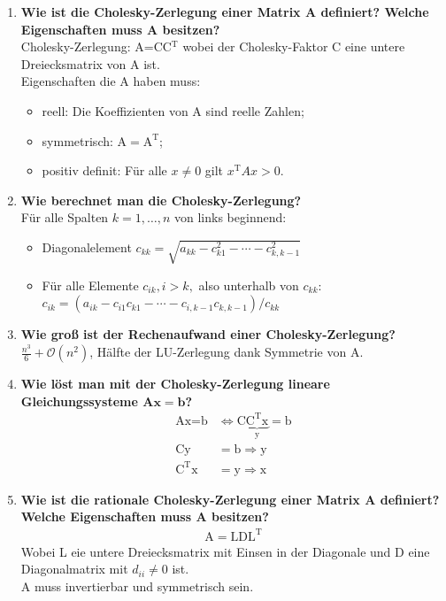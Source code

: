 \begin{enumerate}
		\pagebreak
		
		\item \textbf{Wie ist die Cholesky-Zerlegung einer Matrix A definiert? Welche Eigenschaften muss A besitzen?} \\
			Cholesky-Zerlegung: A=CC\(^\text{T}\) wobei der Cholesky-Faktor C eine untere Dreiecksmatrix von A ist. \\
			Eigenschaften die A haben muss:
			\begin{itemize}
				\item reell: Die Koeffizienten von A sind reelle Zahlen;
				\item symmetrisch: \(\text{A}=\text{A}^\text{T}\);
				\item positiv definit: Für alle \(x\neq0\) gilt \(x^\text{T}Ax>0\).
			\end{itemize}
		
		\item \textbf{Wie berechnet man die Cholesky-Zerlegung?} \\
			Für alle Spalten \(k=1,\dots,n\) von links beginnend:
			\begin{itemize}
				\item[] Diagonalelement \(c_{kk}=\sqrt{a_{kk}-c_{k1}^2-\cdots-c_{k,k-1}^2}\)
				\item[] Für alle Elemente \(c_{ik},i>k,\) also unterhalb von \(c_{kk}\):\\
				\mbox{}\hspace{0.5cm}\(c_{ik}=(a_{ik}-c_{i1}c_{k1}-\cdots-c_{i,k-1}c_{k,k-1})/c_{kk}\)
			\end{itemize}
		
		\item \textbf{Wie groß ist der Rechenaufwand einer Cholesky-Zerlegung?} \\
			\(\frac{n^3}{6}+\mathscr{O}(n^2)\), Hälfte der LU-Zerlegung dank Symmetrie von A.
		
		\item \textbf{Wie löst man mit der Cholesky-Zerlegung lineare Gleichungssysteme \(\mathbf{Ax=b}\)?}
			\begin{align*}
				\text{Ax}=\text{b}&\Longleftrightarrow \text{C}\underbrace{\text{C}^\text{T}\text{x}}_\text{y}=\text{b} \\
				\text{Cy}&=\text{b} \Rightarrow \text{y} \\
				\text{C}^\text{T}\text{x}&=\text{y} \Rightarrow \text{x}
			\end{align*}
		
		\item \textbf{Wie ist die rationale Cholesky-Zerlegung einer Matrix A definiert? Welche Eigenschaften muss A besitzen?}
			\begin{align*}
				\text{A}=\text{LDL}^\text{T}
			\end{align*}
			Wobei L eie untere Dreiecksmatrix mit Einsen in der Diagonale und D eine Diagonalmatrix mit \(d_{ii}\neq0\) ist.\\
			A muss invertierbar und symmetrisch sein.
		

\end{enumerate}

